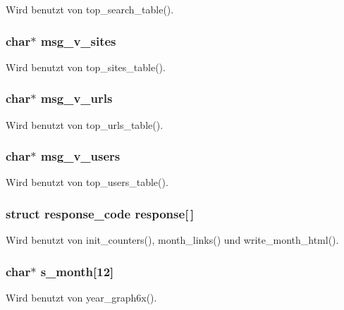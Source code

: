 Wird benutzt von top\_\-search\_\-table().
\subsubsection{\setlength{\rightskip}{0pt plus 5cm}char$\ast$ {\bf msg\_\-v\_\-sites}}\label{lang_8h_7bbd861b776a38bd532d4f29b0735a50}




Wird benutzt von top\_\-sites\_\-table().
\subsubsection{\setlength{\rightskip}{0pt plus 5cm}char$\ast$ {\bf msg\_\-v\_\-urls}}\label{lang_8h_f9cbd6a1a6ac705c14326ed3d64fd1c0}




Wird benutzt von top\_\-urls\_\-table().
\subsubsection{\setlength{\rightskip}{0pt plus 5cm}char$\ast$ {\bf msg\_\-v\_\-users}}\label{lang_8h_bf4cb5cbd2d88d3791abfb27cdb883f9}




Wird benutzt von top\_\-users\_\-table().
\subsubsection{\setlength{\rightskip}{0pt plus 5cm}struct {\bf response\_\-code} {\bf response}[$\,$]}\label{lang_8h_6fbb1449f14f39208f656061d49c280b}




Wird benutzt von init\_\-counters(), month\_\-links() und write\_\-month\_\-html().
\subsubsection{\setlength{\rightskip}{0pt plus 5cm}char$\ast$ {\bf s\_\-month}[12]}\label{lang_8h_9a0b242c466188c82510261247faf983}




Wird benutzt von year\_\-graph6x().